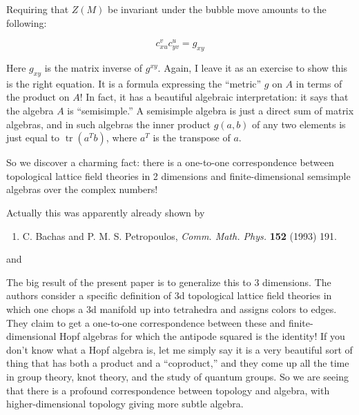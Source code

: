 \documentclass{article}
\def\tightlist{}
\renewcommand{\texttt}[1]{%
  \begingroup
  \ttfamily
  \begingroup\lccode`~=`/\lowercase{\endgroup\def~}{/\discretionary{}{}{}}%
  \begingroup\lccode`~=`[\lowercase{\endgroup\def~}{[\discretionary{}{}{}}%
  \begingroup\lccode`~=`.\lowercase{\endgroup\def~}{.\discretionary{}{}{}}%
  \catcode`/=\active\catcode`[=\active\catcode`.=\active
  \scantokens{#1\noexpand}%
  \endgroup
}
\begin{document}
Requiring that \(Z(M)\) be invariant under the bubble move amounts to
the following:

\[c_{xu}^v c_{yv}^u = g_{xy}\]

Here \(g_{xy}\) is the matrix inverse of \(g^{xy}\). Again, I leave it
as an exercise to show this is the right equation. It is a formula
expressing the ``metric'' \(g\) on \(A\) in terms of the product on
\(A\)! In fact, it has a beautiful algebraic interpretation: it says
that the algebra \(A\) is ``semisimple.'' A semisimple algebra is just a
direct sum of matrix algebras, and in such algebras the inner product
\(g(a,b)\) of any two elements is just equal to
\(\operatorname{tr}(a^T b)\), where \(a^T\) is the transpose of \(a\).

So we discover a charming fact: there is a one-to-one correspondence
between topological lattice field theories in 2 dimensions and
finite-dimensional semsimple algebras over the complex numbers!

Actually this was apparently already shown by

\begin{enumerate}
\def\labelenumi{\arabic{enumi})}
\setcounter{enumi}{1}
\tightlist
\item
  C. Bachas and P. M. S. Petropoulos, \emph{Comm. Math. Phys.}
  \textbf{152} (1993) 191.
\end{enumerate}

and


The big result of the present paper is to generalize this to 3
dimensions. The authors consider a specific definition of 3d topological
lattice field theories in which one chops a 3d manifold up into
tetrahedra and assigns colors to edges. They claim to get a one-to-one
correspondence between these and finite-dimensional Hopf algebras for
which the antipode squared is the identity! If you don't know what a
Hopf algebra is, let me simply say it is a very beautiful sort of thing
that has both a product and a ``coproduct,'' and they come up all the
time in group theory, knot theory, and the study of quantum groups. So
we are seeing that there is a profound correspondence between topology
and algebra, with higher-dimensional topology giving more subtle
algebra.
\end{document}
